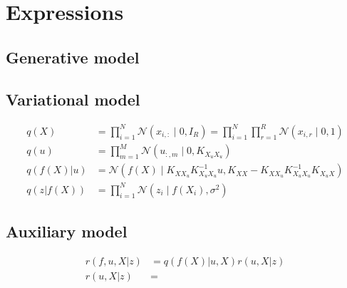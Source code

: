 \documentclass[12pt]{article}
\begin{document}
\section{Expressions}
\subsection{Generative model}
%


\subsection{Variational model}
%
\begin{align}
    q(X) &= \prod_{i=1}^N \mathcal{N}(x_{i,:}\mid 0, I_R) = \prod_{i=1}^N \prod_{r=1}^R \mathcal{N}(x_{i,r}\mid 0,1)\\
    q(u) &= \prod_{m=1}^M \mathcal{N}(u_{:,m}\mid 0, K_{X_uX_u})\\
    q(f(X)|u) &= \mathcal{N}(f(X)\mid K_{XX_u}K_{X_uX_u}^{-1}u, K_{XX}-K_{XX_u}K_{X_uX_u}^{-1}K_{X_uX})\\
    q(z|f(X)) &= \prod_{i=1}^N \mathcal{N}(z_i\mid f(X_i), \sigma^2)
\end{align}


\subsection{Auxiliary model}
%
\begin{align}
    r(f,u,X|z) &= q(f(X)|u,X)r(u,X|z)\\
    r(u,X|z) &=
\end{align}
\end{document}
